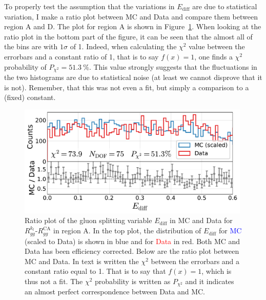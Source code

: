 To properly test the assumption that the variations in $E_\mathrm{diff}$ are due to statistical variation, I make a ratio plot between MC and Data and compare them between region A and D. The plot for region A is shown in Figure~\ref{fig:q:ratio_plot_E_diff_region_A}. When looking at the ratio plot in the bottom part of the figure, it can be seen that the almost all of the bins are with $1\sigma$ of \num{1}. Indeed, when calculating the $\chi^2$ value between the errorbars and a constant ratio of \num{1}, that is to say $f(x)=1$, one finds a $\chi^2$ probability of $P_{\chi^2}=\SI{51.3}{\percent}$. This value strongly suggests that the fluctuations in the two histograms are due to statistical noise (at least we cannot disprove that it is not). Remember, that this was not even a fit, but simply a comparison to a (fixed) constant. 

\begin{figure}%
  \centerfloat
  \includegraphics[width=0.99\textwidth, trim=0 0 0 0, clip]{figures/quarks/cut_region_A_ratio_plot-down_sample=1.00-ML_vars=vertex-selection=b-ejet_min=4-n_iter_RS_lgb=99-n_iter_RS_xgb=9-cdot_cut=0.90-version=19-njet=4.pdf}
  \caption[Ratio Plot of $E_\mathrm{diff}$ in MC and Data for $R_{gg}^{k_t}$-$R_{gg}^\mathrm{CA}$ for Region A]
          {Ratio plot of the gluon splitting variable $E_\mathrm{diff}$ in MC and Data for $R_{gg}^{k_t}$-$R_{gg}^\mathrm{CA}$ in region A. In the top plot, the distribution of $E_\mathrm{diff}$ for \textcolor{blue}{MC} (scaled to Data) is shown in blue and for \textcolor{red}{Data} in red. Both MC and Data has been efficiency corrected. Below are the ratio plot between MC and Data. In text is written the $\chi^2$ between the errorbars and a constant ratio equal to \num{1}. That is to say that $f(x)=1$, which is thus not a fit. The $\chi^2$ probability is written as $P_{\chi^2}$ and it indicates an almost perfect correspondence between Data and MC.} 
  \label{fig:q:ratio_plot_E_diff_region_A}
\end{figure}


